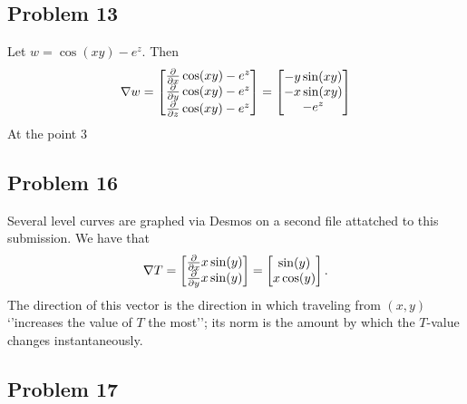 \documentclass[11pt]{article}
\renewcommand{\grad}{\nabla}
\begin{document}

\subsection{Problem 13}

Let $w = \cos(xy) - e^{z}$. Then
\[
	\grad w = \begin{bmatrix} \pdv{x} \cos(xy) - e^{z} \\ \pdv{y} \cos(xy) - e^{z} \\ \pdv{z} \cos(xy) - e^{z} \end{bmatrix} = \begin{bmatrix} -y \sin(xy) \\ -x \sin(xy) \\ -e^{z} \end{bmatrix}
\]
At the point $3$


\subsection{Problem 16}

Several level curves are graphed via Desmos on a second file attatched to this submission. We have that
\[
	\grad T = \begin{bmatrix} \pdv{x} x \sin(y) \\ \pdv{y} x \sin(y) \end{bmatrix} = \begin{bmatrix} \sin(y) \\ x \cos(y) \end{bmatrix}.
\]
The direction of this vector is the direction in which traveling from $(x, y)$ `'increases the value of $T$ the most''; its norm is the amount by which the $T$-value changes instantaneously.


\subsection{Problem 17}
\end{document}
